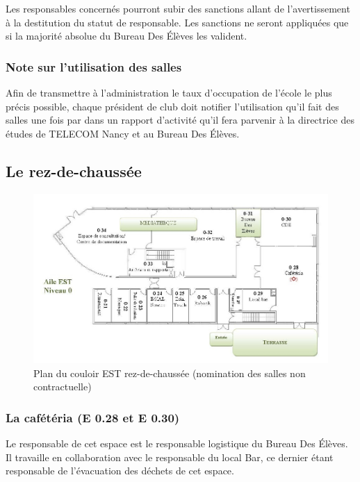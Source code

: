 \documentclass{article} %
\begin{document}
				Les responsables concernés pourront subir des sanctions allant
				de l’avertissement à la destitution du statut de responsable.
				Les sanctions ne seront appliquées que si la majorité absolue du
				Bureau Des Élèves les valident.

			\subsubsection{Note sur l’utilisation des salles}

				Afin de transmettre à l’administration le taux d’occupation de
				l’école le plus précis possible, chaque président de club doit
				notifier l’utilisation qu’il fait des salles une fois par dans
				un rapport d'activité qu'il fera parvenir  à la directrice des
				études de TELECOM Nancy et au Bureau Des Élèves.

		\subsection{Le rez-de-chaussée}
		
		\begin{figure}[]
			\centering
			\includegraphics[width=0.8\linewidth]{images/aile_est}
			\caption{Plan du couloir EST rez-de-chaussée (nomination des salles
			non contractuelle)}
			\label{fig:plan}
		\end{figure}

			\subsubsection{La cafétéria (E 0.28 et E 0.30)}

				Le responsable de cet espace est le responsable logistique du
				Bureau Des Élèves. Il travaille en collaboration avec le
				responsable du local Bar, ce dernier étant responsable de
				l’évacuation des déchets de cet espace.
\end{document}
